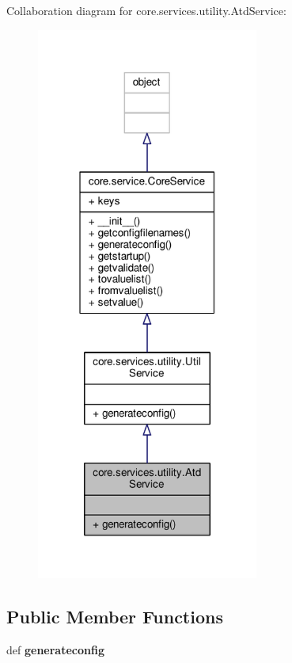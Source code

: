 Collaboration diagram for core.\+services.\+utility.\+Atd\+Service\+:
\nopagebreak
\begin{figure}[H]
\begin{center}
\leavevmode
\includegraphics[width=207pt]{classcore_1_1services_1_1utility_1_1_atd_service__coll__graph}
\end{center}
\end{figure}
\subsection*{Public Member Functions}
\begin{DoxyCompactItemize}
\item 
\hypertarget{classcore_1_1services_1_1utility_1_1_atd_service_a1dd9144c6c48579fa865fb4667709fe9}{def {\bfseries generateconfig}}\label{classcore_1_1services_1_1utility_1_1_atd_service_a1dd9144c6c48579fa865fb4667709fe9}

\end{DoxyCompactItemize}
